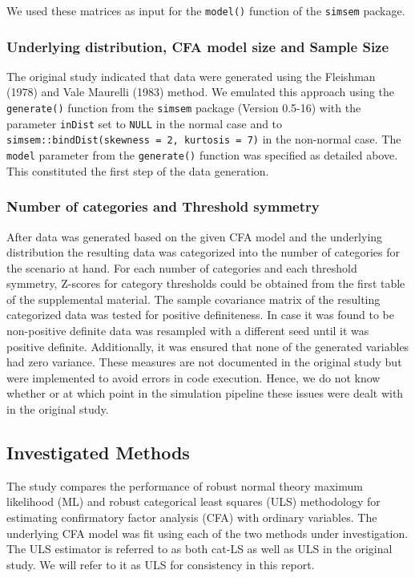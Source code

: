 \documentclass[10,a4paperpaper,]{article}
\begin{document}
We used these matrices as input for the \texttt{model()} function of the
\texttt{simsem} package.

\subsubsection{Underlying distribution, CFA model size and Sample Size}

The original study indicated that data were generated using the
Fleishman (1978) and Vale Maurelli (1983) method. We emulated this
approach using the \texttt{generate()} function from the \texttt{simsem}
package (Version 0.5-16) with the parameter \texttt{inDist} set to
\texttt{NULL} in the normal case and to
\texttt{simsem::bindDist(skewness\ =\ 2,\ kurtosis\ =\ 7)} in the
non-normal case. The \texttt{model} parameter from the
\texttt{generate()} function was specified as detailed above. This
constituted the first step of the data generation.

\subsubsection{Number of categories and Threshold symmetry}

After data was generated based on the given CFA model and the underlying
distribution the resulting data was categorized into the number of
categories for the scenario at hand. For each number of categories and
each threshold symmetry, Z-scores for category thresholds could be
obtained from the first table of the supplemental material. The sample
covariance matrix of the resulting categorized data was tested for
positive definiteness. In case it was found to be non-positive definite
data was resampled with a different seed until it was positive definite.
Additionally, it was ensured that none of the generated variables had
zero variance. These measures are not documented in the original study
but were implemented to avoid errors in code execution. Hence, we do not
know whether or at which point in the simulation pipeline these issues
were dealt with in the original study.

\FloatBarrier 

\subsection{Investigated Methods}

The study compares the performance of robust normal theory maximum
likelihood (ML) and robust categorical least squares (ULS) methodology
for estimating confirmatory factor analysis (CFA) with ordinary
variables. The underlying CFA model was fit using each of the two
methods under investigation. The ULS estimator is referred to as both
cat-LS as well as ULS in the original study. We will refer to it as ULS
for consistency in this report.
\end{document}
